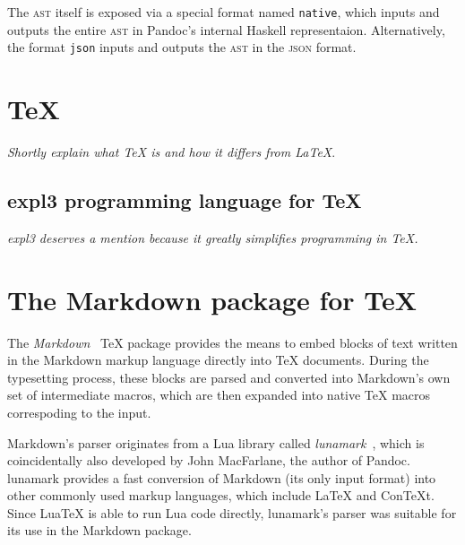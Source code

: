 \documentclass[
  digital,     %
  oneside,     %
  nosansbold,  %
  nocolorbold, %
  lof,         %
  lot,         %
]{fithesis4}
\begin{document}
The \textsc{ast} itself is exposed via a special format named \texttt{native}, which inputs and outputs the entire \textsc{ast} in Pandoc's internal Haskell representaion. Alternatively, the format \texttt{json} inputs and outputs the \textsc{ast} in the \textsc{json} format. %


\section{\TeX{}}
\emph{Shortly explain what \TeX{} is and how it differs from \LaTeX{}}.

\subsection{expl3 programming language for \TeX{}}
\emph{expl3 deserves a mention because it greatly simplifies programming in \TeX{}.}

\section{The Markdown package for \TeX{}}
The \emph{Markdown}~\cite{cstug-markdown} \TeX{} package provides the means to embed blocks of text written in the Markdown markup language directly into \TeX{} documents. During the typesetting process, these blocks are parsed and converted into Markdown's own set of intermediate macros, which are then expanded into native \TeX{} macros correspoding to the input.

Markdown's parser originates from a Lua library called \emph{lunamark}~\cite{lunamark}, which is coincidentally also developed by John MacFarlane, the author of Pandoc. lunamark provides a fast conversion of Markdown (its only input format) into other commonly used markup languages, which include \LaTeX{} and Con\TeX{}t. Since Lua\TeX{} is able to run Lua code directly, lunamark's parser was suitable for its use in the Markdown package.
\end{document}
